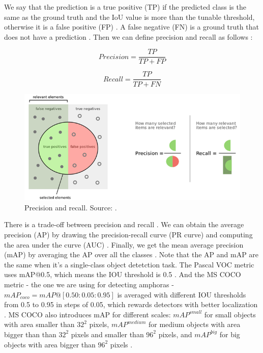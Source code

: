 \documentclass[a4paper,11pt,oneside]{article}
\begin{document}
  We say that the prediction is a true positive (TP) if the predicted class is the same as the ground truth and the IoU
  value is more than the tunable threshold, otherwise it is a false positive (FP)
  \cite{liu2020deep, elgendy2020deep, planche2019hands}. A false negative (FN) is a ground truth that does not have a
  prediction \cite{planche2019hands}. Then we can define precision and recall as follows
  \cite{burkov2019hundred, davis2006relationship}:

  $$Precision = \frac{TP}{TP + FP}$$

  $$Recall = \frac{TP}{TP + FN}$$

  \begin{figure}[ht]
    \begin{center}
      \includegraphics[width=.8\textwidth]{precision_recall.png}
    \end{center}
    \caption{Precision and recall. Source: \cite{precisionrecall}.}
  \end{figure}

  There is a trade-off between precision and recall
  \cite{elgendy2020deep, geron2019hands, burkov2019hundred, planche2019hands}. We can obtain the average precision
  (AP) by drawing the precision-recall curve (PR curve) and computing the area under the curve (AUC)
  \cite{elgendy2020deep, planche2019hands}. Finally, we get the mean average precision (mAP) by averaging
  the AP over all the classes \cite{elgendy2020deep, geron2019hands, planche2019hands}. Note that the AP and mAP are the
  same when it's a single-class object detetction task. The Pascal VOC metric uses mAP@0.5, which means the IOU threshold
  is 0.5 \cite{liu2020deep, everingham2010pascal, planche2019hands}. And the MS COCO metric - the one we are using for
  detecting amphoras - $mAP_{coco} = mAP@[0.50:0.05:0.95]$ is averaged with different IOU thresholds from 0.5 to 0.95 in
  steps of 0.05, which rewards detectors with better localization \cite{liu2020deep, planche2019hands, cocometrics}. MS
  COCO also introduces mAP for different scales: $mAP^{small}$ for small objects with area smaller than $32^2$ pixels,
  $mAP^{medium}$ for medium objects with area bigger than than $32^2$ pixels and smaller than $96^2$ pixels, and
  $mAP^{big}$ for big objects with area bigger than $96^2$ pixels \cite{liu2020deep, cocometrics}.
\end{document}

